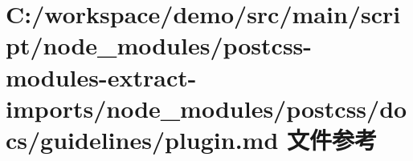 \hypertarget{postcss-modules-extract-imports_2node__modules_2postcss_2docs_2guidelines_2plugin_8md}{}\section{C\+:/workspace/demo/src/main/script/node\+\_\+modules/postcss-\/modules-\/extract-\/imports/node\+\_\+modules/postcss/docs/guidelines/plugin.md 文件参考}
\label{postcss-modules-extract-imports_2node__modules_2postcss_2docs_2guidelines_2plugin_8md}
